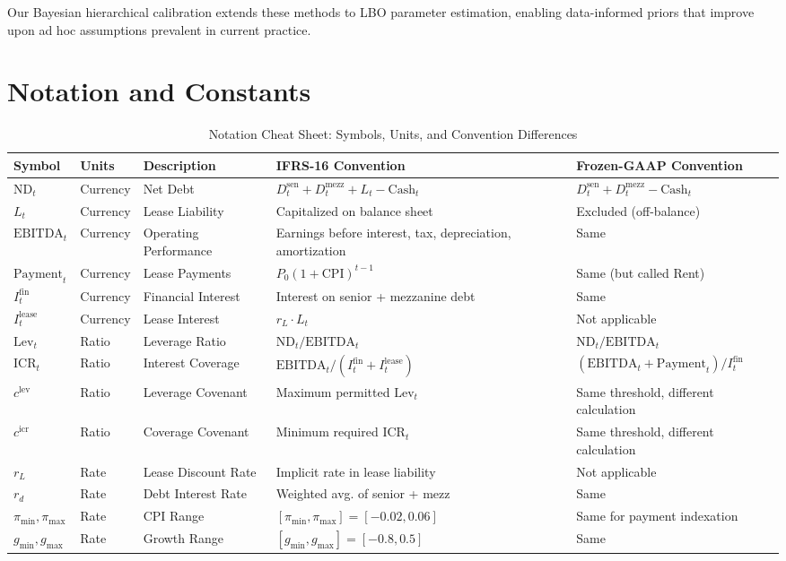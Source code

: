\documentclass[11pt,a4paper]{article}
\newcommand{\ND}{\mathrm{ND}} %
\newcommand{\EBITDA}{\mathrm{EBITDA}}
\newcommand{\ICR}{\mathrm{ICR}}
\newcommand{\Lev}{\mathrm{Lev}}
\newcommand{\Ifin}{I^{\mathrm{fin}}}
\newcommand{\Ilease}{I^{\mathrm{lease}}}
\newcommand{\CPI}{\mathrm{CPI}}
\theoremstyle{plain}
\theoremstyle{definition}
\begin{document}
Our Bayesian hierarchical calibration extends these methods to LBO parameter estimation, enabling data-informed priors that improve upon ad hoc assumptions prevalent in current practice.

\section{Notation and Constants}

\begin{table}[H]
\centering
\caption{Notation Cheat Sheet: Symbols, Units, and Convention Differences}
\label{tab:notation}
\begin{tabular}{llp{2.5cm}p{2.5cm}p{2.5cm}}
\toprule
Symbol & Units & Description & IFRS-16 Convention & Frozen-GAAP Convention \\
\midrule
$\ND_t$ & Currency & Net Debt & $D^{\text{sen}}_t + D^{\text{mezz}}_t + L_t - \text{Cash}_t$ & $D^{\text{sen}}_t + D^{\text{mezz}}_t - \text{Cash}_t$ \\
$L_t$ & Currency & Lease Liability & Capitalized on balance sheet & Excluded (off-balance) \\
$\EBITDA_t$ & Currency & Operating Performance & Earnings before interest, tax, depreciation, amortization & Same \\
$\text{Payment}_t$ & Currency & Lease Payments & $P_0(1+\CPI)^{t-1}$ & Same (but called Rent) \\
$\Ifin_t$ & Currency & Financial Interest & Interest on senior + mezzanine debt & Same \\
$\Ilease_t$ & Currency & Lease Interest & $r_L \cdot L_t$ & Not applicable \\
$\Lev_t$ & Ratio & Leverage Ratio & $\ND_t / \EBITDA_t$ & $\ND_t / \EBITDA_t$ \\
$\ICR_t$ & Ratio & Interest Coverage & $\EBITDA_t / (\Ifin_t + \Ilease_t)$ & $(\EBITDA_t + \text{Payment}_t) / \Ifin_t$ \\
$c^{\text{lev}}$ & Ratio & Leverage Covenant & Maximum permitted $\Lev_t$ & Same threshold, different calculation \\
$c^{\text{icr}}$ & Ratio & Coverage Covenant & Minimum required $\ICR_t$ & Same threshold, different calculation \\
$r_L$ & Rate & Lease Discount Rate & Implicit rate in lease liability & Not applicable \\
$r_d$ & Rate & Debt Interest Rate & Weighted avg. of senior + mezz & Same \\
$\pi_{\min}, \pi_{\max}$ & Rate & CPI Range & $[\pi_{\min}, \pi_{\max}] = [-0.02, 0.06]$ & Same for payment indexation \\
$g_{\min}, g_{\max}$ & Rate & Growth Range & $[g_{\min}, g_{\max}] = [-0.8, 0.5]$ & Same \\
\bottomrule
\end{tabular}
\end{table}
\end{document}

